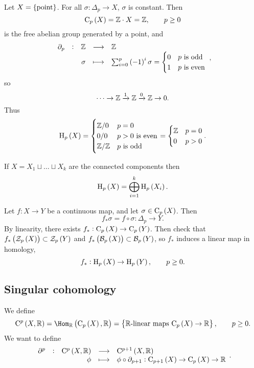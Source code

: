 \pagebreak

\begin{example}
Let $ X = \cbr{\text{point}} $. For all $ \sigma : \Delta_p \to X $, $ \sigma $ is constant. Then
$$ \C_p\br{X} = \ZZ \cdot X = \ZZ, \qquad p \ge 0 $$
is the free abelian group generated by a point, and
$$ \function[\da_p]{\ZZ}{\ZZ}{\sigma}{\sum_{i = 0}^p \br{-1}^i\sigma =
\begin{cases}
0 & p \ \text{is odd} \\
1 & p \ \text{is even}
\end{cases}
}, $$
so
$$ \dots \to \mathbb{Z} \xrightarrow{1} \mathbb{Z} \xrightarrow{0} \mathbb{Z} \to 0. $$
Thus
$$ \H_p\br{X} =
\begin{cases}
\ZZ / 0 & p = 0 \\
0 / 0 & p > 0 \ \text{is even} \\
\ZZ / \ZZ & p \ \text{is odd}
\end{cases}
=
\begin{cases}
\ZZ & p = 0 \\
0 & p > 0
\end{cases}.
$$
\end{example}

\begin{exercise*}
If $ X = X_1 \sqcup \dots \sqcup X_k $ are the connected components then
$$ \H_p\br{X} = \bigoplus_{i = 1}^k \H_p\br{X_i}. $$
\end{exercise*}

\begin{exercise*}
Let $ f : X \to Y $ be a continuous map, and let $ \sigma \in \C_p\br{X} $. Then
$$ f_*\sigma = f \circ \sigma : \Delta_p \to Y. $$
By linearity, there exists $ f_* : \C_p\br{X} \to \C_p\br{Y} $. Then check that $ f_*\br{\ZZZ_p\br{X}} \subset \ZZZ_p\br{Y} $ and $ f_*\br{\BBB_p\br{X}} \subset \BBB_p\br{Y} $, so $ f_* $ induces a linear map in homology,
$$ f_* : \H_p\br{X} \to \H_p\br{Y}, \qquad p \ge 0. $$
\end{exercise*}

\subsection{Singular cohomology}

We define
$$ \C^p\br{X, \RR} = \Hom_\RR\br{\C_p\br{X}, \RR} = \cbr{\text{$ \RR $-linear maps} \ \C_p\br{X} \to \RR}, \qquad p \ge 0. $$
We want to define
$$ \function[\da^p]{\C^p\br{X, \RR}}{\C^{p + 1}\br{X, \RR}}{\phi}{\phi \circ \da_{p + 1} : \C_{p + 1}\br{X} \to \C_p\br{X} \to \RR}. $$

